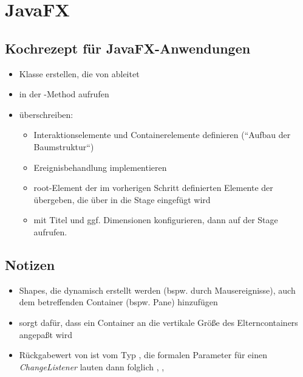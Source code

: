 \section{JavaFX}


\subsection{Kochrezept für JavaFX-Anwendungen}

\begin{itemize}
    \item Klasse erstellen, die von  ableitet
    \item in der -Method  aufrufen
    \item {} überschreiben:
    \begin{itemize}
        \item Interaktionselemente und Containerelemente definieren (``Aufbau der Baumstruktur``)
        \item Ereignisbehandlung implementieren
        \item root-Element der im vorherigen Schritt definierten Elemente der  übergeben, die über  in die Stage eingefügt wird
        \item {} mit Titel und ggf. Dimensionen konfigurieren, dann  auf der Stage aufrufen.
    \end{itemize}
\end{itemize}

\subsection*{Notizen }

\begin{itemize}
    \item Shapes, die dynamisch erstellt werden (bspw. durch Mausereignisse), auch dem betreffenden Container
    (bspw. Pane) hinzufügen
    \item {} sorgt dafür, dass ein Container an die vertikale Größe des Elterncontainers angepaßt wird
    \item Rückgabewert von  ist vom Typ , die formalen Parameter für einen \textit{ChangeListener} lauten dann folglich , , 
\end{itemize}